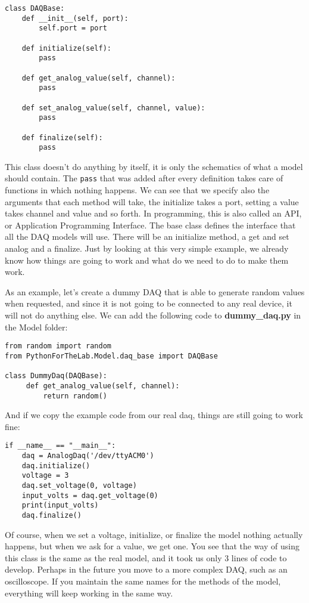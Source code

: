 \begin{verbatim}
class DAQBase:
    def __init__(self, port):
        self.port = port
    
    def initialize(self):
        pass 
            
    def get_analog_value(self, channel):
        pass
    
    def set_analog_value(self, channel, value):
        pass
    
    def finalize(self):
        pass
\end{verbatim}

This class doesn't do anything by itself, it is only the schematics of what a model should contain. The \texttt{pass} that was added after every definition takes care of functions in which nothing happens. We can see that we specify also the arguments that each method will take, the initialize takes a port, setting a value takes channel and value and so forth. In programming, this is also called an API, or Application Programming Interface. The base class defines the interface that all the DAQ models will use. There will be an initialize method, a get and set analog and a finalize. Just by looking at this very simple example, we already know how things are going to work and what do we need to do to make them work. 

As an example, let's create a dummy DAQ that is able to generate random values when requested, and since it is not going to be connected to any real device, it will not do anything else. We can add the following code to \textbf{dummy\_daq.py} in the Model folder:

\begin{verbatim}
from random import random
from PythonForTheLab.Model.daq_base import DAQBase

class DummyDaq(DAQBase):
     def get_analog_value(self, channel):
         return random()
\end{verbatim}

And if we copy the example code from our real daq, things are still going to work fine:

\begin{verbatim}
if __name__ == "__main__":
    daq = AnalogDaq('/dev/ttyACM0')
    daq.initialize()
    voltage = 3
    daq.set_voltage(0, voltage)
    input_volts = daq.get_voltage(0)
    print(input_volts)
    daq.finalize()
\end{verbatim}

Of course, when we set a voltage, initialize, or finalize the model nothing actually happens, but when we ask for a value, we get one. You see that the way of using this class is the same as the real model, and it took us only 3 lines of code to develop. Perhaps in the future you move to a more complex DAQ, such as an oscilloscope. If you maintain the same names for the methods of the model, everything will keep working in the same way. 


